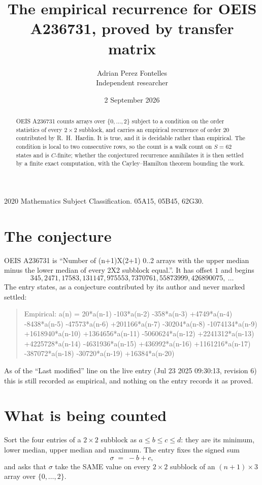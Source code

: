 \documentclass[11pt,a4paper]{article}
\title{The empirical recurrence for OEIS A236731, proved by transfer matrix}
\author{Adrian Perez Fontelles\\ \small Independent researcher}
\date{2 September 2026}
\theoremstyle{plain}
\theoremstyle{definition}
\begin{document}
\maketitle

\begin{abstract}
OEIS A236731 counts arrays over $\{0,\dots,2\}$ subject to a condition on the order
statistics of every $2\times2$ subblock, and carries an empirical recurrence of order
$20$ contributed by R.~H.~Hardin. It is true, and it is decidable rather than empirical.
The condition is local to two consecutive rows, so the count is a walk count on $S=62$
states and is $C$-finite; whether the conjectured recurrence annihilates it is then settled by
a finite exact computation, with the Cayley--Hamilton theorem bounding the work.
\end{abstract}

\noindent\small 2020 Mathematics Subject Classification. 05A15, 05B45, 62G30.\normalsize

\section{The conjecture}

OEIS A236731 is ``Number of (n+1)X(2+1) 0..2 arrays with the upper median minus the lower median of every 2X2 subblock equal.''. It has offset $1$ and begins
\[
345, 2471, 17583, 131147, 975553, 7370761, 55873999, 426890075,\ \dots
\]
The entry states, as a conjecture contributed by its author and never marked settled:
\begin{quote}
Empirical: a(n) = 20*a(n-1) -103*a(n-2) -358*a(n-3) +4749*a(n-4) -8438*a(n-5) -47573*a(n-6) +201166*a(n-7) -30204*a(n-8) -1074134*a(n-9) +1618940*a(n-10) +1364656*a(n-11) -5060624*a(n-12) +2241312*a(n-13) +4225728*a(n-14) -4631936*a(n-15) +436992*a(n-16) +1161216*a(n-17) -387072*a(n-18) -30720*a(n-19) +16384*a(n-20)
\end{quote}
As of the ``Last modified'' line on the live entry (Jul 23 2025 09:30:13, revision 6) this is still
recorded as empirical, and nothing on the entry records it as proved.

\section{What is being counted}

Sort the four entries of a $2\times2$ subblock as $a\le b\le c\le d$: they
are its minimum, lower median, upper median and maximum. The entry fixes the signed sum
\[
\sigma\;=\;-b+c,
\]
and asks that $\sigma$ take the SAME value on every $2\times2$ subblock of an
$(n+1)\times3$ array over $\{0,\dots,2\}$.
\end{document}
